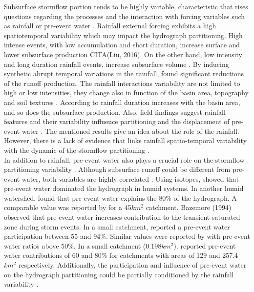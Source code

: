 \documentclass[preprint,12pt]{elsarticle}
\begin{document}
Subsurface stormflow portion tends to be highly variable, characteristic that rises questions regarding the processes and the interaction with forcing variables such as rainfall or pre-event water \citep{Dunkerley2017, Jackisch2016, Torch2013}.  Rainfall external forcing exhibits a high spatiotemporal variability which may impact the hydrograph partitioning.  High intense events, with low accumulation and short duration, increase surface and lower subsurface production CITA(Liu, 2016).  On the other hand, low intensity and long duration rainfall events, increase subsurface volume \citep{Rusjan2015, Blume2015}. By inducing synthetic abrupt temporal variations in the rainfall, \citep{Dunkerley2008} found significant reductions of the runoff production. The rainfall interactions variability are not limited to high or low intensities, they change also in function of the basin area, topography and soil textures \citep{Shope2016, Shope2014}. According to \citep{Mei2015a} rainfall duration increases with the basin area, and so does the subsurface production.  Also, field findings suggest rainfall features and their variability influence partitioning and the displacement of pre-event water \citep{Zabaleta2013, Penna2011}.  The mentioned results give an idea about the role of the rainfall.  However, there is a lack of evidence that links rainfall spatio-temporal variability with the dynamic of the stormflow partitioning \cite{Gomi2010}.\\

In addition to rainfall, pre-event water also plays a crucial role on the stormflow partitioning variability \citep{Dusek2016, Klaus2013,Clow2000,Sklash1979}. Although subsurface runoff could be different from pre-event water, both variables are highly correlated \citep{Wels1991, Rusjan2015}. Using isotopes, \citet{Sklash1979} showed that pre-event water dominated the hydrograph in humid systems.  In another humid watershed, \citet{Cey1998} found that pre-event water explains the 80\% of the hydrograph.  A comparable value was reported by \citet{Buda2009} for a 45$km^2$ catchment.  Bazemore (1994) observed that pre-event water increases contribution to the transient saturated zone during storm events.  In a small catchment, \citet{Dewalle1994} reported a pre-event water participation between 55 and 94\%.  Similar values were reported by \citet{Carey2005} with pre-event water ratios above 50\%. In a small catchment (0.198$km^2$). \citet{Munyaneza2012} reported pre-event water contributions of 60 and 80\% for catchments with areas of 129 and 257.4$km^2$ respectively.  Additionally, the participation and influence of pre-event water on the hydrograph partitioning could be partially conditioned by the rainfall variability \citet{Clow2000}.\\  
\end{document}
